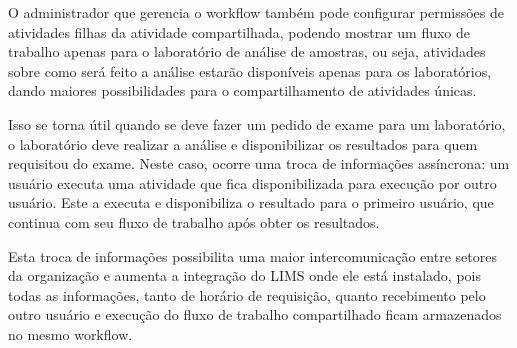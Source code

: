 O administrador que gerencia o workflow também pode configurar permissões de atividades filhas da atividade compartilhada, podendo mostrar um fluxo de trabalho apenas para o laboratório de análise de amostras, ou seja, atividades sobre como será feito a análise estarão disponíveis apenas para os laboratórios, dando maiores possibilidades para o compartilhamento de atividades únicas.

Isso se torna útil quando se deve fazer um pedido de exame para um laboratório, o laboratório deve realizar a análise e disponibilizar os resultados para quem requisitou do exame. Neste caso, ocorre uma troca de informações assíncrona: um usuário executa uma atividade que fica disponibilizada para execução por outro usuário. Este a executa e disponibiliza o resultado para o primeiro usuário, que continua com seu fluxo de trabalho após obter os resultados.

Esta troca de informações possibilita uma maior intercomunicação entre setores da organização e aumenta a integração do LIMS onde ele está instalado, pois todas as informações, tanto de horário de requisição, quanto recebimento pelo outro usuário e execução do fluxo de trabalho compartilhado ficam armazenados no mesmo workflow.